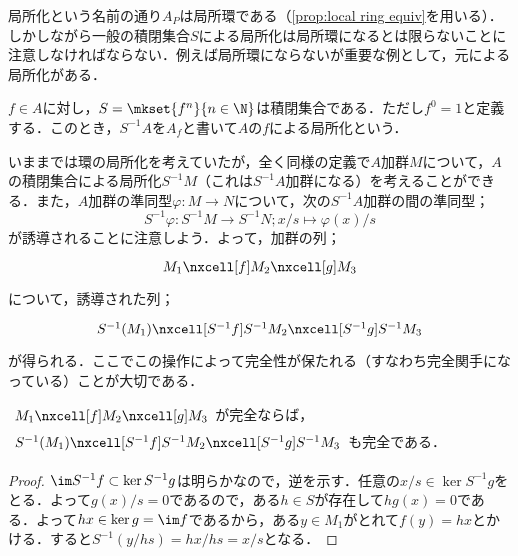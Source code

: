 局所化という名前の通り$A_P$は局所環である（\ref{prop:local ring equiv}を用いる）．しかしながら一般の積閉集合$S$による局所化は局所環になるとは限らないことに注意しなければならない．例えば局所環にならないが重要な例として，元による局所化がある．

\begin{defi}\label{defi:元による局所化}
	$f\in A$に対し，$S=\mkset{f^n}{n\in\N}$は積閉集合である．ただし$f^0=1$と定義する．このとき，$S^{-1}A$を$A_f$と書いて$A$の$f$による局所化という．	
\end{defi}

いままでは環の局所化を考えていたが，全く同様の定義で$A$加群$M$について，$A$の積閉集合による局所化$S^{-1}M$（これは$S^{-1}A$加群になる）を考えることができる．また，$A$加群の準同型$\varphi:M\to N$について，次の$S^{-1}A$加群の間の準同型；
\[S^{-1}\varphi:S^{-1}M\to S^{-1}N;x/s\mapsto \varphi(x)/s\]
が誘導されることに注意しよう．よって，加群の列；
\[\begin{tikzcd}
M_1\nxcell[f]M_2\nxcell[g]M_3
\end{tikzcd}\]
について，誘導された列；
\[\begin{tikzcd}
S^{-1}(M_1)\nxcell[S^{-1}f]S^{-1}M_2\nxcell[S^{-1}g]S^{-1}M_3
\end{tikzcd}\]
が得られる．ここでこの操作によって完全性が保たれる（すなわち完全関手になっている）ことが大切である．

\begin{prop}\label{prop:局所化は完全関手}
	$\begin{tikzcd}
	M_1\nxcell[f]M_2\nxcell[g]M_3
	\end{tikzcd}$が完全ならば，$\begin{tikzcd}
	S^{-1}(M_1)\nxcell[S^{-1}f]S^{-1}M_2\nxcell[S^{-1}g]S^{-1}M_3
	\end{tikzcd}$も完全である．
\end{prop}
\begin{proof}
	$\im S^{-1}f\subset\ker S^{-1}g$は明らかなので，逆を示す．任意の$x/s\in\ker S^{-1}g$をとる．よって$g(x)/s=0$であるので，ある$h\in S$が存在して$hg(x)=0$である．よって$hx\in\ker g=\im f$であるから，ある$y\in M_1$がとれて$f(y)=hx$とかける．すると$S^{-1}(y/hs)=hx/hs=x/s$となる．
\end{proof}

